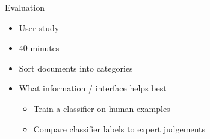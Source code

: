 \documentclass[compress]{beamer}
\begin{document}
\begin{frame}{Evaluation}

  \begin{itemize}
    \item User study
    \item 40 minutes
    \item Sort documents into categories
    \item What information / interface \alert<2>{helps best}
      \pause
      \pause
      \begin{itemize}
        \item Train a classifier on human examples
        \item Compare classifier labels to expert judgements
      \end{itemize}
  \end{itemize}

\end{frame}
\end{document}

